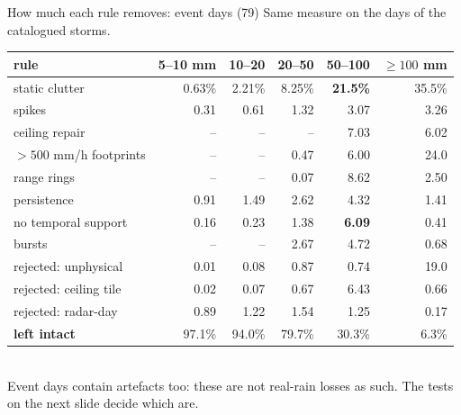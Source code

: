 \documentclass[aspectratio=169,10pt]{beamer}
\begin{document}
\begin{frame}{How much each rule removes: event days (79)}
  \footnotesize
  Same measure on the days of the catalogued storms.\\[4pt]
  \begin{tabular}{lrrrrr}
    \toprule
    rule & 5--10 mm & 10--20 & 20--50 & 50--100 & $\ge 100$ mm \\
    \midrule
    static clutter & 0.63\% & 2.21\% & 8.25\% & \textbf{21.5\%} & 35.5\% \\
    spikes & 0.31 & 0.61 & 1.32 & 3.07 & 3.26 \\
    ceiling repair & -- & -- & -- & 7.03 & 6.02 \\
    $>500$ mm/h footprints & -- & -- & 0.47 & 6.00 & 24.0 \\
    range rings & -- & -- & 0.07 & 8.62 & 2.50 \\
    persistence & 0.91 & 1.49 & 2.62 & 4.32 & 1.41 \\
    no temporal support & 0.16 & 0.23 & 1.38 & \textbf{6.09} & 0.41 \\
    bursts & -- & -- & 2.67 & 4.72 & 0.68 \\
    rejected: unphysical & 0.01 & 0.08 & 0.87 & 0.74 & 19.0 \\
    rejected: ceiling tile & 0.02 & 0.07 & 0.67 & 6.43 & 0.66 \\
    rejected: radar-day & 0.89 & 1.22 & 1.54 & 1.25 & 0.17 \\
    \midrule
    \textbf{left intact} & 97.1\% & 94.0\% & 79.7\% & 30.3\% & 6.3\% \\
    \bottomrule
  \end{tabular}\\[4pt]
  Event days contain artefacts too: these are not real-rain losses as such. The tests on the next
  slide decide which are.
\end{frame}
\end{document}
